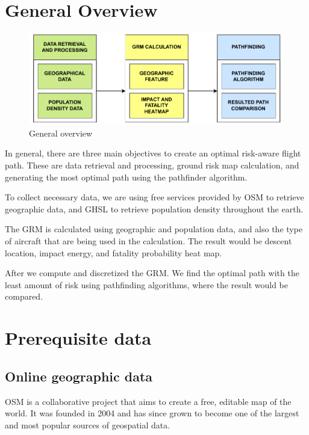 \documentclass[12pt]{report}
\begin{document}
    \section{General Overview}
        \begin{figure}[H]
            \centering
            \includegraphics[width=\textwidth]{General Image/OSM Drone-General Overview.pdf}
            \caption{General overview}
        \end{figure}

        In general, there are three main objectives to create an optimal risk-aware flight path. These are data
        retrieval and processing, ground risk map calculation, and generating the most optimal path using the pathfinder
        algorithm.

        To collect necessary data, we are using free services provided by \ac{OSM} \cite{noauthor_openstreetmap_2022} to retrieve geographic
        data, and \ac{GHSL} \cite{noauthor_global_2023} to retrieve population density throughout the earth.

        The \ac{GRM} is calculated using geographic and population data, and also the type of aircraft that are being used in
        the calculation. The result would be descent location, impact energy, and fatality probability heat map. 
        
        After we compute and discretized the GRM. We find the optimal path with the least amount of risk using
        pathfinding algorithms, where the result would be compared.

    \section{Prerequisite data}
        \subsection{Online geographic data}
            OSM \cite{noauthor_openstreetmap_2022} is a collaborative project that aims to create a free, editable map of the world. It was founded in
            2004 and has since grown to become one of the largest and most popular sources of geospatial data.
\end{document}
